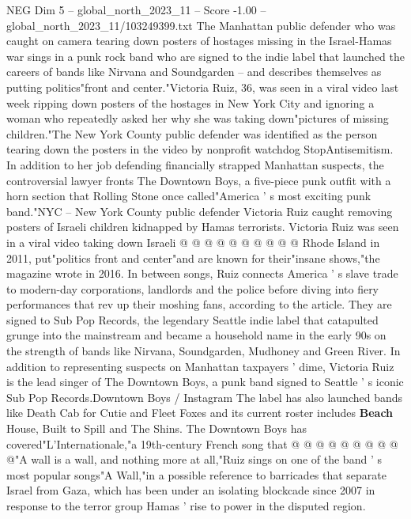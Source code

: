 \begin{textsample}{NEG Dim 5 – global\_north\_2023\_11 – Score -1.00 – global\_north\_2023\_11/103249399.txt}  \label{ex:f5_neg_048}
The Manhattan public defender who was caught on camera tearing down posters of hostages missing in the Israel-Hamas war sings in a punk rock band who are signed to the indie label that launched the careers of bands like Nirvana and Soundgarden -- and describes themselves as putting politics"front and center."Victoria Ruiz, 36, was seen in a viral video last week ripping down posters of the hostages in New York City and ignoring a woman who repeatedly asked her why she was taking down"pictures of missing children."The New York County public defender was identified as the person tearing down the posters in the video by nonprofit watchdog StopAntisemitism.
In addition to her job defending financially strapped Manhattan suspects, the controversial lawyer fronts The Downtown Boys, a five-piece punk outfit with a horn section that Rolling Stone once called"America ' s most exciting punk band."NYC -- New York County public defender Victoria Ruiz caught removing posters of Israeli children kidnapped by Hamas terrorists.
Victoria Ruiz was seen in a viral video taking down Israeli @ @ @ @ @ @ @ @ @ @ Rhode Island in 2011, put"politics front and center"and are known for their"insane shows,"the magazine wrote in 2016.
In between songs, Ruiz connects America ' s slave trade to modern-day corporations, landlords and the police before diving into fiery performances that rev up their moshing fans, according to the article.
They are signed to Sub Pop Records, the legendary Seattle indie label that catapulted grunge into the mainstream and became a household name in the early 90s on the strength of bands like Nirvana, Soundgarden, Mudhoney and Green River.
In addition to representing suspects on Manhattan taxpayers ' dime, Victoria Ruiz is the lead singer of The Downtown Boys, a punk band signed to Seattle ' s iconic Sub Pop Records.Downtown Boys / Instagram The label has also launched bands like Death Cab for Cutie and Fleet Foxes and its current roster includes \textbf{Beach} House, Built to Spill and The Shins.
The Downtown Boys has covered"L'Internationale,"a 19th-century French song that @ @ @ @ @ @ @ @ @ @"A wall is a wall, and nothing more at all,"Ruiz sings on one of the band ' s most popular songs"A Wall,"in a possible reference to barricades that separate Israel from Gaza, which has been under an isolating blockcade since 2007 in response to the terror group Hamas ' rise to power in the disputed region.

\end{textsample}
